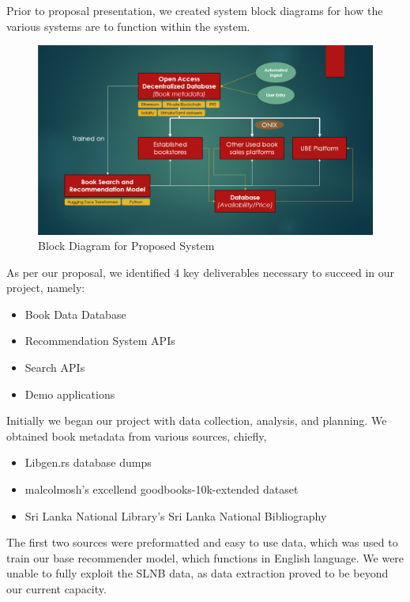 Prior to proposal presentation, we created system block diagrams for how the various systems are to function within the system.

\begin{figure}[htbp]
    \centering
    \includegraphics[width=1\textwidth]{../../assets/proposal_block_diagram.png}
    \caption{Block Diagram for Proposed System}
    \label{fig:example}
\end{figure}

As per our proposal, we identified 4 key deliverables necessary to succeed in our project, namely:

\begin{itemize}
    \item Book Data Database
    \item Recommendation System APIs
    \item Search APIs
    \item Demo applications
\end{itemize}

Initially we began our project with data collection, analysis, and planning. We obtained book metadata from various sources, chiefly,
\begin{itemize}
    \item Libgen.rs database dumps
    \item malcolmosh's excellend goodbooks-10k-extended dataset
    \item Sri Lanka National Library's Sri Lanka National Bibliography
\end{itemize}

The first two sources were preformatted and easy to use data, which was used to train our base recommender model, which functions in English language. We were unable to fully exploit the SLNB data, as data extraction proved to be beyond our current capacity.

